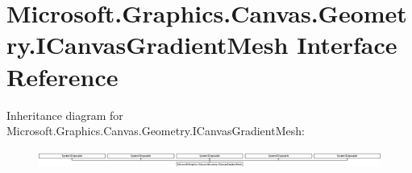\hypertarget{interface_microsoft_1_1_graphics_1_1_canvas_1_1_geometry_1_1_i_canvas_gradient_mesh}{}\section{Microsoft.\+Graphics.\+Canvas.\+Geometry.\+I\+Canvas\+Gradient\+Mesh Interface Reference}
\label{interface_microsoft_1_1_graphics_1_1_canvas_1_1_geometry_1_1_i_canvas_gradient_mesh}
Inheritance diagram for Microsoft.\+Graphics.\+Canvas.\+Geometry.\+I\+Canvas\+Gradient\+Mesh\+:\begin{figure}[H]
\begin{center}
\leavevmode
\includegraphics[height=0.618785cm]{interface_microsoft_1_1_graphics_1_1_canvas_1_1_geometry_1_1_i_canvas_gradient_mesh}
\end{center}
\end{figure}
